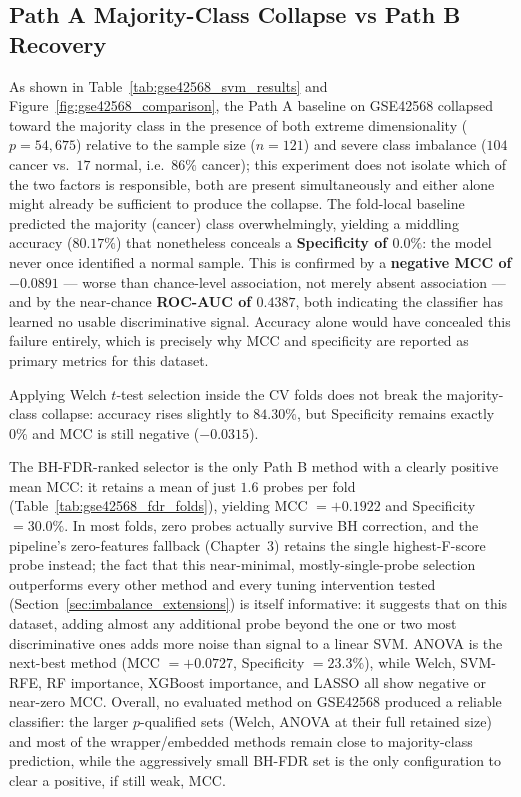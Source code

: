 \subsection{Path A Majority-Class Collapse vs Path B Recovery}
\label{sec:gse42568_discussion}

As shown in Table~\ref{tab:gse42568_svm_results} and Figure~\ref{fig:gse42568_comparison}, the Path A baseline on GSE42568 collapsed toward the majority class in the presence of both extreme dimensionality ($p=54{,}675$) relative to the sample size ($n=121$) and severe class imbalance ($104$ cancer vs.\ $17$ normal, i.e.\ $86\%$ cancer); this experiment does not isolate which of the two factors is responsible, both are present simultaneously and either alone might already be sufficient to produce the collapse. The fold-local baseline predicted the majority (cancer) class overwhelmingly, yielding a middling accuracy ($80.17\%$) that nonetheless conceals a \textbf{Specificity of $0.0\%$}: the model never once identified a normal sample. This is confirmed by a \textbf{negative MCC of $-0.0891$} --- worse than chance-level association, not merely absent association --- and by the near-chance \textbf{ROC-AUC of $0.4387$}, both indicating the classifier has learned no usable discriminative signal. Accuracy alone would have concealed this failure entirely, which is precisely why MCC and specificity are reported as primary metrics for this dataset.

Applying Welch $t$-test selection inside the CV folds does not break the majority-class collapse: accuracy rises slightly to $84.30\%$, but Specificity remains exactly $0\%$ and MCC is still negative ($-0.0315$).

The BH-FDR-ranked selector is the only Path B method with a clearly positive mean MCC: it retains a mean of just $1.6$ probes per fold (Table~\ref{tab:gse42568_fdr_folds}), yielding MCC $=+0.1922$ and Specificity $=30.0\%$. In most folds, zero probes actually survive BH correction, and the pipeline's zero-features fallback (Chapter~3) retains the single highest-F-score probe instead; the fact that this near-minimal, mostly-single-probe selection outperforms every other method and every tuning intervention tested (Section~\ref{sec:imbalance_extensions}) is itself informative: it suggests that on this dataset, adding almost any additional probe beyond the one or two most discriminative ones adds more noise than signal to a linear SVM. ANOVA is the next-best method (MCC $=+0.0727$, Specificity $=23.3\%$), while Welch, SVM-RFE, RF importance, XGBoost importance, and LASSO all show negative or near-zero MCC. Overall, no evaluated method on GSE42568 produced a reliable classifier: the larger $p$-qualified sets (Welch, ANOVA at their full retained size) and most of the wrapper/embedded methods remain close to majority-class prediction, while the aggressively small BH-FDR set is the only configuration to clear a positive, if still weak, MCC.

